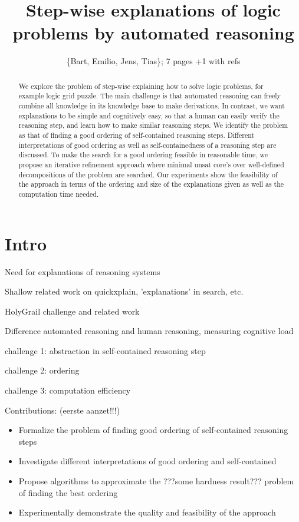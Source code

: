 \documentclass{ecai}
\begin{document}
\title{Step-wise explanations of logic problems by automated reasoning}

\author{\{Bart, Emilio, Jens, Tias\}; 7 pages +1 with refs}

\maketitle


\begin{abstract}
We explore the problem of step-wise explaining how to solve logic problems, for example logic grid puzzle. The main challenge is that automated reasoning can freely combine all knowledge in its knowledge base to make derivations. In contrast, we want explanations to be simple and cognitively easy, so that a human can easily verify the reasoning step, and learn how to make similar reasoning steps.
We identify the problem as that of finding a good ordering of self-contained reasoning steps. Different interpretations of good ordering as well as self-containedness of a reasoning step are discussed. To make the search for a good ordering feasible in reasonable time, we propose an iterative refinement approach where minimal unsat core's over well-defined decompositions of the problem are searched. Our experiments show the feasibility of the approach in terms of the ordering and size of the explanations given as well as the computation time needed.
\end{abstract}


\section{Intro}
Need for explanations of reasoning systems

Shallow related work on quickxplain, 'explanations' in search, etc.

HolyGrail challenge and related work

Difference automated reasoning and human reasoning, measuring cognitive load

challenge 1: abstraction in self-contained reasoning step

challenge 2: ordering

challenge 3: computation efficiency

Contributions: (eerste aanzet!!!)
\begin{itemize}
\item Formalize the problem of finding good ordering of self-contained reasoning steps
\item Investigate different interpretations of good ordering and self-contained
\item Propose algorithms to approximate the ???some hardness result??? problem of finding the best ordering
\item Experimentally demonstrate the quality and feasibility of the approach
\end{itemize}
\end{document}
